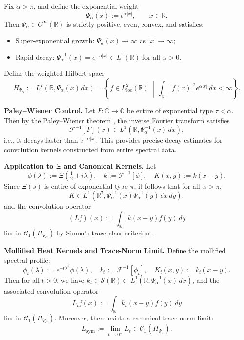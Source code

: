 \begin{definition}\label{def:exponential-weight}
Fix \( \alpha > \pi \), and define the exponential weight
\[
\Psi_\alpha(x) := e^{\alpha |x|}, \qquad x \in \mathbb{R}.
\]
Then \( \Psi_\alpha \in C^\infty(\mathbb{R}) \) is strictly positive, even, convex, and satisfies:
\begin{itemize}
    \item Super-exponential growth: \( \Psi_\alpha(x) \to \infty \) as \( |x| \to \infty \);
    \item Rapid decay: \( \Psi_\alpha^{-1}(x) = e^{-\alpha |x|} \in L^1(\mathbb{R}) \) for all \( \alpha > 0 \).
\end{itemize}

Define the weighted Hilbert space
\[
H_{\Psi_\alpha} := L^2(\mathbb{R}, \Psi_\alpha(x)\, dx) = \left\{ f \in L^2_{\mathrm{loc}}(\mathbb{R}) \ \middle|\ \int_{\mathbb{R}} |f(x)|^2 e^{\alpha |x|}\, dx < \infty \right\}.
\]

\medskip
\noindent\textbf{Paley–Wiener Control.}
Let \( F \colon \mathbb{C} \to \mathbb{C} \) be entire of exponential type \( \tau < \alpha \). Then by the Paley–Wiener theorem \cite[Thm.~3.2.4]{Levin1996EntireLectures}, the inverse Fourier transform satisfies
\[
\mathscr{F}^{-1}[F](x) \in L^1(\mathbb{R}, \Psi_\alpha^{-1}(x)\, dx),
\]
i.e., it decays faster than \( e^{-\alpha |x|} \). This provides precise decay estimates for convolution kernels constructed from entire spectral data.

\medskip
\noindent\textbf{Application to \(\Xi\) and Canonical Kernels.}
Let
\[
\phi(\lambda) := \Xi\left( \tfrac{1}{2} + i\lambda \right), \quad
k := \mathscr{F}^{-1}[\phi], \quad
K(x,y) := k(x - y).
\]
Since \( \Xi(s) \) is entire of exponential type \( \pi \), it follows that for all \( \alpha > \pi \),
\[
K \in L^1(\mathbb{R}^2, \Psi_\alpha^{-1}(x)\Psi_\alpha^{-1}(y)\, dx\,dy),
\]
and the convolution operator
\[
(Lf)(x) := \int_{\mathbb{R}} k(x - y) f(y)\, dy
\]
lies in \( \mathcal{C}_1(H_{\Psi_\alpha}) \) by Simon's trace-class criterion \cite[Thm.~4.2]{Simon2005TraceIdeals}.

\medskip
\noindent\textbf{Mollified Heat Kernels and Trace-Norm Limit.}
Define the mollified spectral profile:
\[
\phi_t(\lambda) := e^{-t\lambda^2} \phi(\lambda), \quad
k_t := \mathscr{F}^{-1}[\phi_t], \quad
K_t(x,y) := k_t(x - y).
\]
Then for all \( t > 0 \), we have \( k_t \in \mathcal{S}(\mathbb{R}) \subset L^1(\mathbb{R}, \Psi_\alpha^{-1}(x)\, dx) \), and the associated convolution operator
\[
L_t f(x) := \int_{\mathbb{R}} k_t(x - y) f(y)\, dy
\]
lies in \( \mathcal{C}_1(H_{\Psi_\alpha}) \). Moreover, there exists a canonical trace-norm limit:
\[
L_{\mathrm{sym}} := \lim_{t \to 0^+} L_t \in \mathcal{C}_1(H_{\Psi_\alpha}).
\]


\end{definition}
